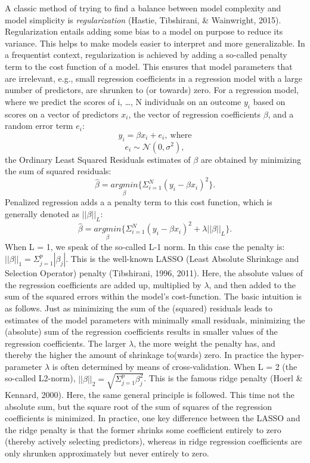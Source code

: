 \documentclass[
  man, donotrepeattitle,floatsintext]{apa6}
\begin{document}
A classic method of trying to find a balance between model complexity and model simplicity is \emph{regularization} (Hastie, Tibshirani, \& Wainwright, 2015). Regularization entails adding some bias to a model on purpose to reduce its variance. This helps to make models easier to interpret and more generalizable. In a frequentist context, regularization is achieved by adding a so-called penalty term to the cost function of a model. This ensures that model parameters that are irrelevant, e.g., small regression coefficients in a regression model with a large number of predictors, are shrunken to (or towards) zero. For a regression model, where we predict the scores of i, \ldots, N individuals on an outcome \(y_i\) based on scores on a vector of predictors \(x_i\), the vector of regression coefficients \(\beta\), and a random error term \(e_i\):
\[y_i = \beta x_i + e_i, \ \text{where} \]
\[e_i \sim \mathcal{N}(0, \sigma^2), \]
the Ordinary Least Squared Residuals estimates of \(\beta\) are obtained by minimizing the sum of squared residuals:
\[ \hat{\beta} = \underset{\beta}{argmin} \{ \Sigma_{i=1}^N(y_i - \beta x_{i} )^2 \}.\] Penalized regression adds a a penalty term to this cost function, which is generally denoted as \(||\beta||_L\):
\[ \hat{\beta} = \underset{\beta}{argmin} \{ \Sigma_{i=1}^N(y_i - \beta x_{i} )^2 + \lambda ||\beta||_{L} \}.\]
When L = 1, we speak of the so-called L-1 norm. In this case the penalty is: \(||\beta||_1 = \Sigma_{j=1}^p |\beta_j|\). This is the well-known LASSO (Least Absolute Shrinkage and Selection Operator) penalty (Tibshirani, 1996, 2011). Here, the absolute values of the regression coefficients are added up, multiplied by \(\lambda\), and then added to the sum of the squared errors within the model's cost-function. The basic intuition is as follows. Just as minimizing the sum of the (squared) residuals leads to estimates of the model parameters with minimally small residuals, minimizing the (absolute) sum of the regression coefficients results in smaller values of the regression coefficients. The larger \(\lambda\), the more weight the penalty has, and thereby the higher the amount of shrinkage to(wards) zero. In practice the hyper-parameter \(\lambda\) is often determined by means of cross-validation. When L = 2 (the so-called L2-norm), \(||\beta||_2 = \sqrt{\Sigma_{j=1}^p \beta_j^2}\). This is the famous ridge penalty (Hoerl \& Kennard, 2000). Here, the same general principle is followed. This time not the absolute sum, but the square root of the sum of squares of the regression coefficients is minimized. In practice, one key difference between the LASSO and the ridge penalty is that the former shrinks some coefficient entirely to zero (thereby actively selecting predictors), whereas in ridge regression coefficients are only shrunken approximately but never entirely to zero.
\end{document}

